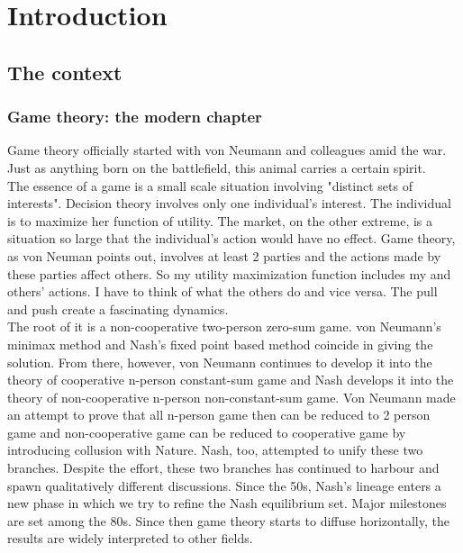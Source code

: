 \documentclass[12.5pt]{report}
\begin{document}
\listoffigures
 
\listoftables

\chapter{Introduction}
\section{The context}
\subsection{Game theory: the modern chapter}

Game theory officially started with von Neumann and colleagues amid the war. Just as anything born on the battlefield, this animal carries a certain spirit.\\

The essence of a game is a small scale situation involving "distinct sets of interests". Decision theory involves only one individual's interest. The individual is to maximize her function of utility. The market, on the other extreme, is a situation so large that the individual's action would have no effect. Game theory, as von Neuman points out, involves at least 2 parties and the actions made by these parties affect others. So my utility maximization function includes my and others' actions. I have to think of what the others do and vice versa. The pull and push create a fascinating dynamics.\\

The root of it is a non-cooperative two-person zero-sum game. von Neumann's minimax method and Nash's fixed point based method coincide in giving the solution. From there, however, von Neumann continues to develop it into the theory of cooperative n-person constant-sum game and Nash develops it into the theory of non-cooperative n-person non-constant-sum game. Von Neumann made an attempt to prove that all n-person game then can be reduced to 2 person game and non-cooperative game can be reduced to cooperative game by introducing collusion with Nature. Nash, too, attempted to unify these two branches. Despite the effort, these two branches has continued to harbour and spawn qualitatively different discussions. Since the 50s, Nash's lineage enters a new phase in which we try to refine the Nash equilibrium set. Major milestones are set among the 80s. Since then game theory starts to diffuse horizontally, the results are widely interpreted to other fields. \\
\end{document}
